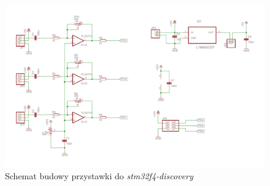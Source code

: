  \begin{figure}[h]
    \centering
    \includegraphics[width=1\textwidth, trim= 5mm 0mm 0mm 0mm,clip]{mainboard2}
    \caption{Schemat budowy przystawki do \textit{stm32f4-discovery}}
    \label{fig:przystawka}
\end{figure}


